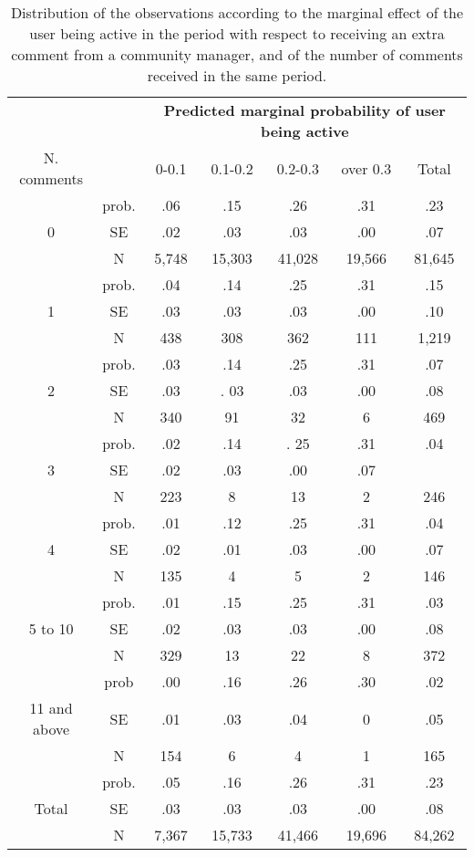 \begin{table}[htbp]\centering
	\label{tab:marginalProbability_wr_x_cmrec}
	\begin{tabular}{c c | c  c  c  c | c}
 & & \multicolumn{5}{c}{\textbf{Predicted marginal probability of user being active}} \\
N. comments& & 0-0.1&0.1-0.2&0.2-0.3&over 0.3&Total \\
\hline
& prob. & .06 & .15 & .26 & .31 & .23 \\ 
0 & SE & .02 & .03 & .03 & .00 & .07 \\
& N & 5,748&15,303&41,028&19,566&81,645 \\
\hline
 & prob. & .04 & .14 & .25 & .31 & .15 \\
1 & SE & .03 & .03 & .03 & .00 & .10 \\
&N&438&308&362&111&1,219 \\
\hline
& prob. & .03 & .14 & .25 & .31 & .07 \\
2 & SE & .03 & . 03 & .03 & .00 & .08 \\
& N&340&91&32&6&469 \\
\hline
& prob. & .02 & .14 & . 25 & .31 & .04 \\
3 & SE & .02 & .03 & .00 & .07 \\
&N&223&8&13&2&246 \\
\hline
& prob. & .01 & .12 & .25 & .31 & .04 \\
4 & SE & .02 & .01 & .03 & .00 & .07 \\
& N & 135 & 4 & 5 & 2 & 146 \\
\hline
& prob. & .01 & .15 & .25 & .31 & .03 \\
5 to 10 & SE & .02 & .03 &.03 & .00 & .08 \\
& N&329&13&22&8&372 \\
\hline
& prob & .00 & .16 & .26 & .30 & .02 \\
11 and above & SE & .01 & .03 & .04 & 0 & .05 \\
& N &154&6&4&1&165 \\
\hline
& prob. & .05 & .16 & .26 & .31 &.23 \\
Total & SE & .03 & .03 & .03 & .00 & .08\\
& N &7,367&15,733&41,466&19,696&84,262 \\
\hline
	\end{tabular}
	\caption{Distribution of the observations according to the marginal effect of the user being active in the period with respect to receiving an extra comment from a community manager, and of the number of comments received in the same period.}
\end{table}
